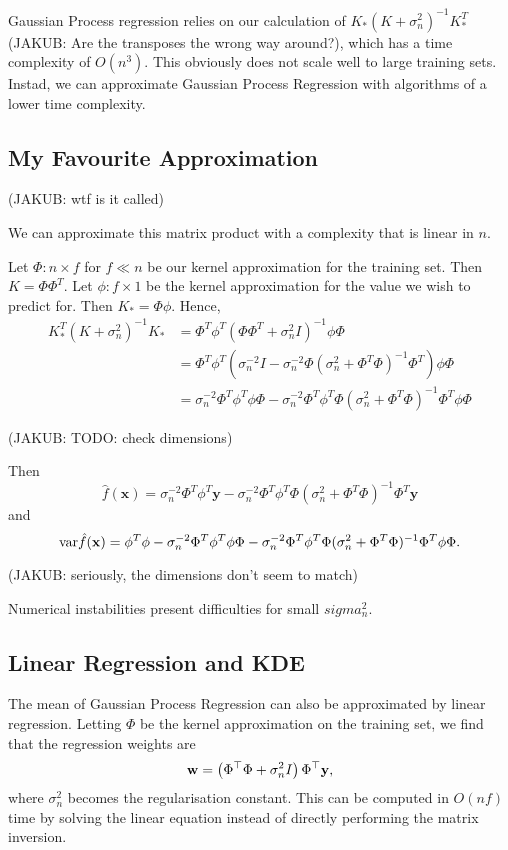 \documentclass[11pt,twoside]{report}
\newcommand\bw{\mathbf{w}}
\newcommand\bx{\mathbf{x}}
\newcommand\by{\mathbf{y}}
\newcommand\var{\mathrm{var}}
\newcommand\jakub[1]{{\color{red}(JAKUB: #1)}}
\begin{document}
Gaussian Process regression relies on our calculation of $K_*(K+\sigma_n^2)^{-1}K_*^T$ \jakub{Are the transposes the wrong way around?}, which has a time complexity of $O(n^3)$. This obviously does not scale well to large training sets. Instad, we can approximate Gaussian Process Regression with algorithms of a lower time complexity.

\subsection{My Favourite Approximation}

\jakub{wtf is it called}

We can approximate this matrix product with a complexity that is linear in $n$.

Let $\Phi : n \times f$ for $f \ll n$ be our kernel approximation for the training set. Then $K = \Phi \Phi^T$. Let $\phi : f \times 1$ be the kernel approximation for the value we wish to predict for. Then $K_* = \Phi \phi$. Hence,\begin{align*}
    K_*^T(K+\sigma_n^2)^{-1}K_* &= \Phi^T \phi^T \left(\Phi \Phi^T + \sigma_n^2I\right)^{-1} \phi\Phi \\
    &= \Phi^T \phi^T \left( \sigma_n^{-2}I - \sigma_n^{-2}\Phi(\sigma_n^{2} + \Phi^T\Phi)^{-1}\Phi^T\right) \phi\Phi \\
    &=  \sigma_n^{-2}\Phi^T \phi^T\phi\Phi - \sigma_n^{-2}\Phi^T \phi^T\Phi(\sigma_n^{2} + \Phi^T\Phi)^{-1}\Phi^T\phi\Phi
\end{align*}

\jakub{TODO: check dimensions}

Then \[
    \hat f(\bx) = \sigma_n^{-2}\Phi^T \phi^T\by - \sigma_n^{-2}\Phi^T \phi^T\Phi(\sigma_n^{2} + \Phi^T\Phi)^{-1}\Phi^T\by
\] and \[
    \var \hat f(\bx) = \phi^T\phi - \sigma_n^{-2}\Phi^T \phi^T\phi\Phi - \sigma_n^{-2}\Phi^T \phi^T\Phi(\sigma_n^{2} + \Phi^T\Phi)^{-1}\Phi^T\phi\Phi\text.
\]

\jakub{seriously, the dimensions don't seem to match}

Numerical instabilities present difficulties for small $sigma_n^2$.

\subsection{Linear Regression and KDE}

The mean of Gaussian Process Regression can also be approximated by linear regression. Letting $\Phi$ be the kernel approximation on the training set, we find that the regression weights are\[
    \bw = \left(\Phi^\top\Phi + \sigma_n^2 I\right) \Phi^\top\by\text,
\] where $\sigma_n^2$ becomes the regularisation constant. This can be computed in $O(nf)$ time by solving the linear equation instead of directly performing the matrix inversion.
\end{document}
